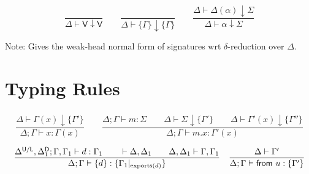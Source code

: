 \documentclass[10pt,a4paper]{article}
\newcommand\ff[1]{\ensuremath{\mathbin{\mathrm{#1\null}}}\xspace}
\newcommand\y[1]{\ensuremath{\mathsf{#1}}\xspace}
\newcommand\K[1]{\ensuremath{\textsf{#1}}}
\newcommand\note[1]{\noindent #1}
\begin{document}
\subsubsection*{}

$$
\frac{
}{
  \Delta \vdash \y{V} \downarrow \y{V}
}
\qquad
\frac{
}{
  \Delta \vdash \{\Gamma\} \downarrow \{\Gamma\}
}
\qquad
\frac{
  \Delta \vdash \Delta(\alpha) \downarrow \Sigma
}{
  \Delta \vdash \alpha \downarrow \Sigma
}
$$

\note{
Note: Gives the weak-head normal form of signatures wrt $\delta$-reduction over $\Delta$.
\clearpage
}


\section{Typing Rules}

%
%


\subsubsection*{}

$$
\frac{
  \Delta \vdash \Gamma(x) \downarrow \{\Gamma'\}
}{
  \Delta; \Gamma \vdash x : \Gamma(x)
}
\qquad
\frac{
  \Delta; \Gamma \vdash m : \Sigma
  \qquad
  \Delta \vdash \Sigma \downarrow \{\Gamma'\}
  \qquad
  \Delta \vdash \Gamma'(x) \downarrow \{\Gamma''\}
}{
  \Delta; \Gamma \vdash m\K.x : \Gamma'(x)
}
$$

$$
\frac{
  \Delta^{\UU/\LL},\Delta_1^\DD; \Gamma,\Gamma_1 \vdash d : \Gamma_1
  \qquad
  \vdash \Delta,\Delta_1
  \qquad
  \Delta,\Delta_1 \vdash \Gamma,\Gamma_1
}{
  \Delta; \Gamma \vdash \{d\} : \{\Gamma_1|_{\ff{exports}(d)}\}
}
\quad
\frac{
  \Delta \vdash \Gamma'
}{
  \Delta; \Gamma \vdash \K{from}~u : \{\Gamma'\}
}
$$
\end{document}

